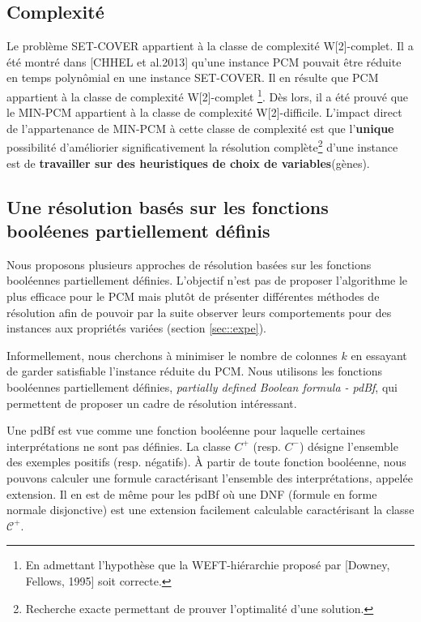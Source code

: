 \subsection{Complexité}
Le problème SET-COVER appartient à la classe de complexité W[2]-complet. Il a été montré dans [CHHEL et al.2013] qu'une instance PCM pouvait être réduite en temps polynômial en une instance SET-COVER. Il en résulte que PCM appartient à la classe de complexité W[2]-complet \footnote{En admettant l'hypothèse que la WEFT-hiérarchie proposé par [Downey, Fellows, 1995] soit correcte.}. Dès lors, il a été prouvé que le MIN-PCM appartient à la classe de complexité W[2]-difficile. L'impact direct de l'appartenance de MIN-PCM à cette classe de complexité est que l'\textbf{unique} possibilité d'améliorier significativement la résolution complète\footnote{Recherche exacte permettant de prouver l'optimalité d'une solution.} d'une instance est de \textbf{travailler sur des heuristiques de choix de variables}(gènes). 

\subsection{Une résolution basés sur les fonctions booléenes partiellement définis}
Nous proposons plusieurs approches de résolution basées sur les fonctions booléennes
partiellement définies. L'objectif n'est pas de proposer l'algorithme le plus efficace pour le PCM mais plutôt de présenter différentes méthodes de résolution afin de pouvoir par la suite observer leurs comportements pour des instances  aux propriétés variées (section \ref{sec::expe}).

Informellement, nous cherchons à minimiser le nombre de colonnes $k$ en essayant
de garder satisfiable l'instance réduite du PCM. Nous utilisons les fonctions booléennes partiellement définies, {\em partially
defined Boolean formula - pdBf},  \cite{Iba99} qui permettent de proposer un
cadre de résolution intéressant.

Une pdBf est vue comme une fonction booléenne pour laquelle  certaines interprétations ne
sont pas définies.
La classe ${C}^{+}$ (resp. ${C}^{-}$)  désigne l'ensemble des exemples positifs
(resp. négatifs).
À partir de toute fonction booléenne, nous pouvons calculer une formule
caractérisant l'ensemble des interprétations, appelée extension. Il en est de
même pour les pdBf où une DNF (formule en forme normale disjonctive) est une
extension facilement calculable caractérisant la classe $\mathcal{C}^+$.

